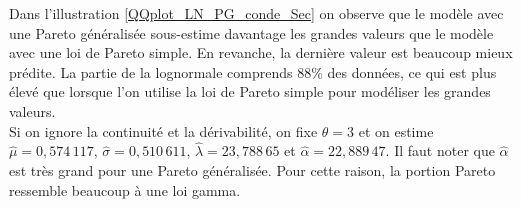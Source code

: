 		Dans l'illustration \ref{QQplot_LN_PG_conde_Sec} on observe que le modèle avec une Pareto généralisée sous-estime davantage les grandes valeurs que le modèle avec une loi de Pareto simple. En revanche, la dernière valeur est beaucoup mieux prédite. La partie de la lognormale comprends 88\% des données, ce qui est plus élevé que lorsque l'on utilise la loi de Pareto simple pour modéliser les grandes valeurs. \\
		
		Si on ignore la continuité et la dérivabilité, on fixe $\theta = 3$ et on estime $\hat{\mu} =0,574\,117$, $\hat{\sigma}=0,510\,611$, $\hat{\lambda} =  23,788\,65$ et $\hat{\alpha} = 22,889\,47$. Il faut noter que $\hat{\alpha}$ est très grand pour une Pareto généralisée. Pour cette raison, la portion Pareto ressemble beaucoup à une loi gamma.
		
